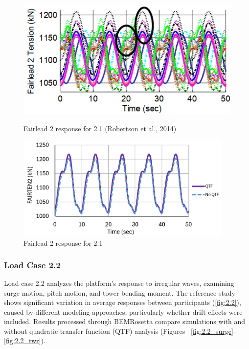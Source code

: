 \documentclass[a4paper, 11pt]{article}
\begin{document}
\begin{figure}[H]
    \begin{minipage}{0.48\textwidth}
        \centering
        \includegraphics[width=1\textwidth]{2.1_fairten2.png}
        \caption{\small Fairlead 2 response for 2.1 (Robertson et al., 2014)}
        \label{fig:2.1_fairten2}
    \end{minipage}
    \hfill
    \begin{minipage}{0.51\textwidth}
        \centering
        \vspace{-0.3cm}
        \includegraphics[width=0.95\textwidth]{2.1_fairten2_mine.png}
        \caption{\small Fairlead 2 response for 2.1}
        \label{fig:2.1_fairten2_mine}
    \end{minipage}
\end{figure}

\subsubsection{Load Case 2.2}

\hspace{0.5cm}Load case 2.2 analyzes the platform's response to irregular waves, examining surge motion, pitch motion, and tower bending moment. The reference study shows significant variation in average responses between participants (\autoref{fig:2.2}), caused by different modeling approaches, particularly whether drift effects were included. Results processed through BEMRosetta compare simulations with and without quadratic transfer function (QTF) analysis (Figures ~\ref{fig:2.2_surge}--\ref{fig:2.2_twr}).
\end{document}

